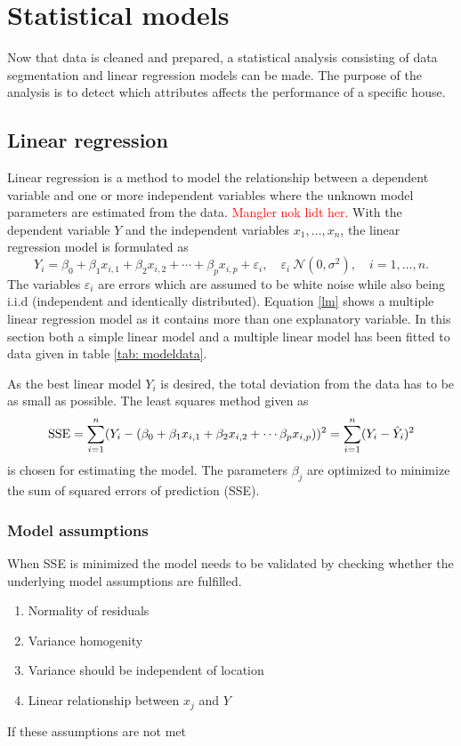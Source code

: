 \chapter{Statistical models}
Now that data is cleaned and prepared, a statistical analysis consisting of data segmentation and linear regression models can be made. The purpose of the analysis is to detect which attributes affects the performance of a specific house. 

\section{Linear regression}
Linear regression is a method to model the relationship between a dependent variable and one or more independent variables where the unknown model parameters are estimated from the data. \textcolor{red}{Mangler nok lidt her.} With the dependent variable $Y$ and the independent variables $x_1, \dots, x_n$, the linear regression model is formulated as 
\begin{equation}
    Y_i = \beta_0 + \beta_1 x_{i,1} + \beta_2 x_{i,2} + \cdots + \beta_p x_{i,p} + \varepsilon_i, \quad \varepsilon_i ~ \mathcal{N}(0,\sigma^2), \quad i = 1,\dots, n. \label{lm}
\end{equation}
The variables $\varepsilon_i$ are errors which are assumed to be white noise while also being i.i.d (independent and identically distributed). Equation \eqref{lm} shows a multiple linear regression model as it contains more than one explanatory variable. In this section both a simple linear model and a multiple linear model has been fitted to data given in table \ref{tab: modeldata}. 

\noindent As the best linear model $Y_i$ is desired, the total deviation from the data has to be as small as possible. The least squares method given as 
\begin{equation}
    \text{SSE} = \sum_{i=1}^n (Y_i - (\beta_0 + \beta_1 x_{i,1} + \beta_2 x_{i,2} + \cdots  \beta_p x_{i,p}))^2 = \sum_{i=1}^n (Y_i - \Hat{Y}_i)^2 
\end{equation} 
is chosen for estimating the model. The parameters $\beta_j$ are optimized to minimize the sum of squared errors of prediction (SSE).

\subsection{Model assumptions}
\noindent When SSE is minimized the model needs to be validated by checking whether the underlying model assumptions are fulfilled. 
\begin{enumerate} [label=\textbf{\arabic*}]
    \item Normality of residuals 
    \item Variance homogenity
    \item Variance should be independent of location
    \item Linear relationship between $x_j$ and $Y$
\end{enumerate}
If these assumptions are not met \\

